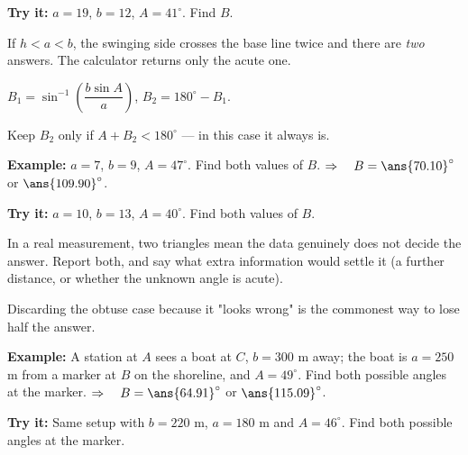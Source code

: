 \documentclass[12pt]{article}
\begin{document}
\begin{tryitbox}
\textbf{Try it:} \quad $a = 19$, $b = 12$, $A = 41^\circ$. Find $B$.\\[2pt]
\end{tryitbox}


\begin{formulabox}
If $h < a < b$, the swinging side crosses the base line twice and there are \emph{two} answers. The calculator returns only the acute one.\par
$B_1 = \sin^{-1}\!\left(\dfrac{b\sin A}{a}\right)$, \qquad $B_2 = 180^\circ - B_1$.\par
Keep $B_2$ only if $A + B_2 < 180^\circ$ --- in this case it always is.
\end{formulabox}

\begin{examplebox}
\textbf{Example:} \quad $a = 7$, $b = 9$, $A = 47^\circ$. Find both values of $B$.
$\Rightarrow\quad B = \ans{70.10}^\circ$ or $\ans{109.90}^\circ$.
\end{examplebox}

\begin{tryitbox}
\textbf{Try it:} \quad $a = 10$, $b = 13$, $A = 40^\circ$. Find both values of $B$.\\[2pt]
\end{tryitbox}


\begin{formulabox}
In a real measurement, two triangles mean the data genuinely does not decide the answer. Report both, and say what extra information would settle it (a further distance, or whether the unknown angle is acute).\par
Discarding the obtuse case because it "looks wrong" is the commonest way to lose half the answer.
\end{formulabox}

\begin{examplebox}
\textbf{Example:} \quad A station at $A$ sees a boat at $C$, $b = 300$ m away; the boat is $a = 250$ m from a marker at $B$ on the shoreline, and $A = 49^\circ$. Find both possible angles at the marker.
$\Rightarrow\quad B = \ans{64.91}^\circ$ or $\ans{115.09}^\circ$.
\end{examplebox}

\begin{tryitbox}
\textbf{Try it:} \quad Same setup with $b = 220$ m, $a = 180$ m and $A = 46^\circ$. Find both possible angles at the marker.\\[2pt]
\end{tryitbox}
\end{document}
